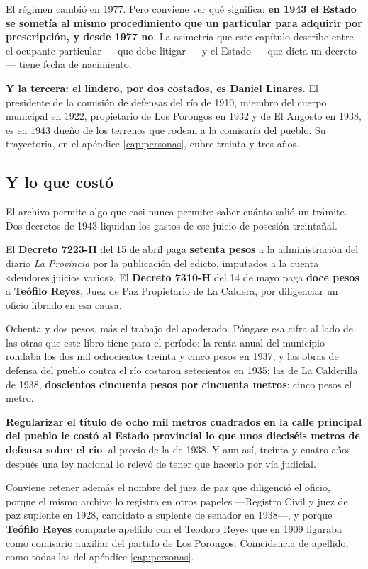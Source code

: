 El régimen cambió en 1977. Pero conviene ver qué significa: \textbf{en 1943 el Estado se
sometía al mismo procedimiento que un particular para adquirir por prescripción, y desde
1977 no}. La asimetría que este capítulo describe entre el ocupante particular --- que debe
litigar --- y el Estado --- que dicta un decreto --- tiene fecha de nacimiento.

\textbf{Y la tercera: el lindero, por dos costados, es Daniel Linares.} El presidente de la
comisión de defensas del río de 1910, miembro del cuerpo municipal en 1922, propietario de
Los Porongos en 1932 y de El Angosto en 1938, es en 1943 dueño de los terrenos que rodean a
la comisaría del pueblo. Su trayectoria, en el apéndice \ref{cap:personas}, cubre treinta y tres años.

\subsection*{Y lo que costó}

El archivo permite algo que casi nunca permite: saber cuánto salió un trámite. Dos decretos
de 1943 liquidan los gastos de ese juicio de posesión treintañal.

El \textbf{Decreto 7223-H} del 15 de abril paga \textbf{setenta pesos} a la administración del
diario \textit{La Provincia} por la publicación del edicto, imputados a la cuenta «deudores
juicios varios». El \textbf{Decreto 7310-H} del 14 de mayo paga \textbf{doce pesos} a
\textbf{Teófilo Reyes}, Juez de Paz Propietario de La Caldera, por diligenciar un oficio
librado en esa causa.

Ochenta y dos pesos, más el trabajo del apoderado. Póngase esa cifra al lado de las otras que
este libro tiene para el período: la renta anual del municipio rondaba los dos mil
ochocientos treinta y cinco pesos en 1937, y las obras de defensa del pueblo contra el río
costaron setecientos en 1935; las de La Calderilla de 1938, \textbf{doscientos cincuenta pesos por cincuenta metros}: cinco pesos el metro.

\textbf{Regularizar el título de ocho mil metros cuadrados en la calle principal del pueblo le costó al Estado provincial lo que unos dieciséis metros de defensa sobre el río}, al precio de la de 1938. Y aun así, treinta
y cuatro años después una ley nacional lo relevó de tener que hacerlo por vía judicial.

Conviene retener además el nombre del juez de paz que diligenció el oficio, porque el mismo
archivo lo registra en otros papeles ---Registro Civil y juez de paz suplente en 1928, candidato a suplente de senador en 1938---, y porque \textbf{Teófilo Reyes} comparte apellido con el Teodoro
Reyes que en 1909 figuraba como comisario auxiliar del partido de Los Porongos. Coincidencia
de apellido, como todas las del apéndice \ref{cap:personas}.

